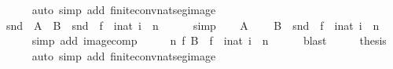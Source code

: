 \begin{isabellebody}
\ \ \ \ \isamarkupfalse%
\ {\isacharparenleft}{\kern0pt}auto\ simp\ add{\isacharcolon}{\kern0pt}\ finite{\isacharunderscore}{\kern0pt}conv{\isacharunderscore}{\kern0pt}nat{\isacharunderscore}{\kern0pt}seg{\isacharunderscore}{\kern0pt}image{\isacharparenright}{\kern0pt}\isanewline
\ \ \isamarkupfalse%
\ \isamarkupfalse%
\ {\isachardoublequoteopen}snd\ {\isacharbackquote}{\kern0pt}\ {\isacharparenleft}{\kern0pt}A\ {\isasymtimes}\ B{\isacharparenright}{\kern0pt}\ {\isacharequal}{\kern0pt}\ snd\ {\isacharbackquote}{\kern0pt}\ f\ {\isacharbackquote}{\kern0pt}\ {\isacharbraceleft}{\kern0pt}i{\isacharcolon}{\kern0pt}{\isacharcolon}{\kern0pt}nat{\isachardot}{\kern0pt}\ i\ {\isacharless}{\kern0pt}\ n{\isacharbraceright}{\kern0pt}{\isachardoublequoteclose}\isanewline
\ \ \ \ \isamarkupfalse%
\ simp\isanewline
\ \ \isamarkupfalse%
\ {\isacartoucheopen}A\ {\isasymnoteq}\ {\isacharbraceleft}{\kern0pt}{\isacharbraceright}{\kern0pt}{\isacartoucheclose}\ \isamarkupfalse%
\ {\isachardoublequoteopen}B\ {\isacharequal}{\kern0pt}\ {\isacharparenleft}{\kern0pt}snd\ {\isasymcirc}\ f{\isacharparenright}{\kern0pt}\ {\isacharbackquote}{\kern0pt}\ {\isacharbraceleft}{\kern0pt}i{\isacharcolon}{\kern0pt}{\isacharcolon}{\kern0pt}nat{\isachardot}{\kern0pt}\ i\ {\isacharless}{\kern0pt}\ n{\isacharbraceright}{\kern0pt}{\isachardoublequoteclose}\isanewline
\ \ \ \ \isamarkupfalse%
\ {\isacharparenleft}{\kern0pt}simp\ add{\isacharcolon}{\kern0pt}\ image{\isacharunderscore}{\kern0pt}comp{\isacharparenright}{\kern0pt}\isanewline
\ \ \isamarkupfalse%
\ \isamarkupfalse%
\ {\isachardoublequoteopen}{\isasymexists}n\ f{\isachardot}{\kern0pt}\ B\ {\isacharequal}{\kern0pt}\ f\ {\isacharbackquote}{\kern0pt}\ {\isacharbraceleft}{\kern0pt}i{\isacharcolon}{\kern0pt}{\isacharcolon}{\kern0pt}nat{\isachardot}{\kern0pt}\ i\ {\isacharless}{\kern0pt}\ n{\isacharbraceright}{\kern0pt}{\isachardoublequoteclose}\isanewline
\ \ \ \ \isamarkupfalse%
\ blast\isanewline
\ \ \isamarkupfalse%
\ \isamarkupfalse%
\ {\isacharquery}{\kern0pt}thesis\isanewline
\ \ \ \ \isamarkupfalse%
\ {\isacharparenleft}{\kern0pt}auto\ simp\ add{\isacharcolon}{\kern0pt}\ finite{\isacharunderscore}{\kern0pt}conv{\isacharunderscore}{\kern0pt}nat{\isacharunderscore}{\kern0pt}seg{\isacharunderscore}{\kern0pt}image{\isacharparenright}{\kern0pt}\isanewline
{}\isamarkupfalse%
%
\endisatagproof
{\isafoldproof}%
%
\isadelimproof

\end{isabellebody}
